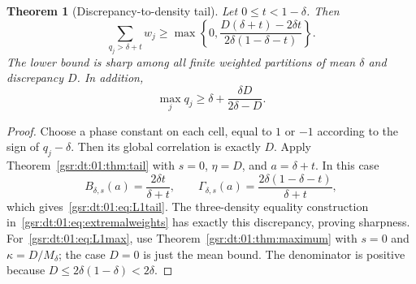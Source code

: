 \documentclass[11pt,letterpaper]{article}
\numberwithin{equation}{section}
\newtheorem{theorem}{Theorem}[section]
\theoremstyle{definition}
\theoremstyle{remark}
\newcommand{\1}{\mathbf 1}
\newcommand{\BB}{B_{\delta,s}}
\newcommand{\GG}{\Gamma_{\delta,s}}
\begin{document}
\begin{theorem}[Discrepancy-to-density tail]\label{gsr:dt:01:thm:L1}
Let $0\le t<1-\delta$. Then
\begin{equation}\label{gsr:dt:01:eq:L1tail}
 \sum_{q_j>\delta+t}w_j\ge
 \max\left\{0,
 \frac{D(\delta+t)-2\delta t}
      {2\delta(1-\delta-t)}\right\}.
\end{equation}
The lower bound is sharp among all finite weighted partitions of mean
$\delta$ and discrepancy $D$. In addition,
\begin{equation}\label{gsr:dt:01:eq:L1max}
 \max_jq_j\ge\delta+\frac{\delta D}{2\delta-D}.
\end{equation}
\end{theorem}
\begin{proof}
Choose a phase constant on each cell, equal to $1$ or $-1$ according to
the sign of $q_j-\delta$. Then its global correlation is exactly $D$.
Apply Theorem~\ref{gsr:dt:01:thm:tail} with $s=0$, $\eta=D$, and $a=\delta+t$.
In this case
\[
 \BB(a)=\frac{2\delta t}{\delta+t},\qquad
 \GG(a)=\frac{2\delta(1-\delta-t)}{\delta+t},
\]
which gives~\eqref{gsr:dt:01:eq:L1tail}. The three-density equality construction
in~\eqref{gsr:dt:01:eq:extremalweights} has exactly this discrepancy, proving
sharpness. For~\eqref{gsr:dt:01:eq:L1max}, use Theorem~\ref{gsr:dt:01:thm:maximum} with
$s=0$ and $\kappa=D/M_\delta$; the case $D=0$ is just the mean bound.
The denominator is positive because $D\le2\delta(1-\delta)<2\delta$.
\end{proof}
\end{document}
